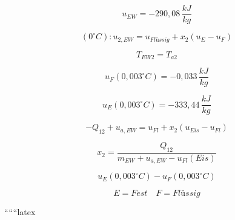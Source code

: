 \[
u_{EW} = -290,08 \, \frac{kJ}{kg}
\]

\[
(0^\circ C): u_{2,EW} = u_{Flüssig} + x_{2} (u_{E} - u_{F})
\]

\[
T_{EW2} = T_{a2}
\]

\[
u_{F}(0,003^\circ C) = -0,033 \, \frac{kJ}{kg}
\]

\[
u_{E}(0,003^\circ C) = -333,44 \, \frac{kJ}{kg}
\]

\[
-Q_{12} + u_{a,EW} = u_{Fl} + x_{2} (u_{Eis} - u_{Fl})
\]

\[
x_{2} = \frac{Q_{12}}{m_{EW} + u_{a,EW} - u_{Fl}(Eis)}
\]

\[
u_{E}(0,003^\circ C) - u_{F}(0,003^\circ C)
\]

\[
E = Fest \quad F = Flüssig
\]

``````latex


